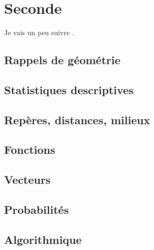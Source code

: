 \documentclass[a4paper,12pt]{book}
\begin{document}




\newpage



\tableofcontents

\newpage

\part{Seconde}

Je vais un peu suivre \cite{oklaEg}.
\setcounter{chapter}{-1}

\chapter{Rappels de géométrie}


\chapter{Statistiques descriptives}




\chapter{Repères, distances, milieux}


\chapter{Fonctions}




\chapter{Vecteurs}


\chapter{Probabilités}


\chapter{Algorithmique}

\end{document}
